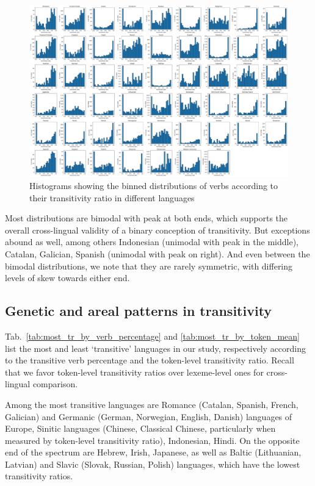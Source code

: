 \begin{figure}
  \centering
  \includegraphics[width=\textwidth]{figures/verb_dist_by_transitivity.pdf}
  \caption{Histograms showing the binned distributions of verbs according to their transitivity ratio in different languages}
  \label{fig:verb_dist_transitivity}
\end{figure}

Most distributions are bimodal with peak at both ends, which supports the overall cross-lingual validity of a binary conception of transitivity. But exceptions abound as well, among others Indonesian (unimodal with peak in the middle), Catalan, Galician, Spanish (unimodal with peak on right). And even between the bimodal distributions, we note that they are rarely symmetric, with differing levels of skew towards either end. 

\subsection{Genetic and areal patterns in transitivity}



Tab.~\ref{tab:most_tr_by_verb_percentage} and \ref{tab:most_tr_by_token_mean} list the most and least `transitive' languages in our study, respectively according to the transitive verb percentage and the token-level transitivity ratio. Recall that we favor token-level transitivity ratios over lexeme-level ones for cross-lingual comparison.

Among the most transitive languages are Romance (Catalan, Spanish, French, Galician) and Germanic (German, Norwegian, English, Danish) languages of Europe, Sinitic languages (Chinese, Classical Chinese, particularly when measured by token-level transitivity ratio), Indonesian, Hindi. On the opposite end of the spectrum are Hebrew, Irish, Japanese, as well as Baltic (Lithuanian, Latvian) and Slavic (Slovak, Russian, Polish) languages, which have the lowest transitivity ratios.

